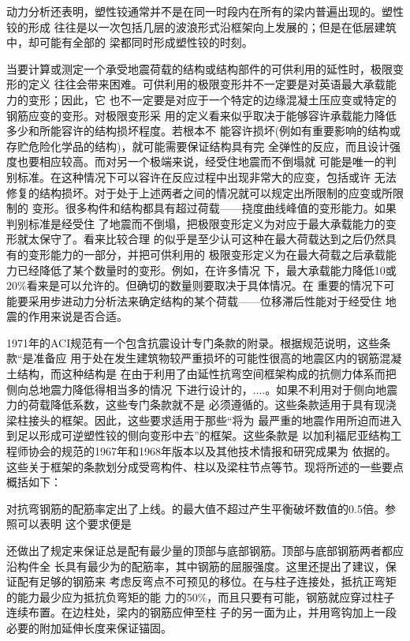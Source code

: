 \documentclass[12pt,a4paper]{book}
\begin{document}
动力分析还表明，塑性铰通常并不是在同一时段内在所有的梁内普遍出现的。塑性铰的形成
往往是以一次包括几层的波浪形式沿框架向上发展的；但是在低层建筑中，却可能有全部的
梁都同时形成塑性铰的时刻。

当要计算或测定一个承受地震荷载的结构或结构部件的可供利用的延性时，极限变形的定义
往往会带来困难。可供利用的极限变形并不一定要是对英语最大承载能力的变形；因此，它
也不一定要是对应于一个特定的边缘混凝土压应变或特定的钢筋应变的变形。对极限变形采
用的定义看来似乎取决于能够容许承载能力降低多少和所能容许的结构损坏程度。若根本不
能容许损坏(例如有重要影响的结构或存贮危险化学品的结构)，就可能需要保证结构具有完
全弹性的反应，而且设计强度也要相应较高。而对另一个极端来说，经受住地震而不倒塌就
可能是唯一的判别标准。在这种情况下可以容许在反应过程中出现非常大的应变，包括或许
无法修复的结构损坏。对于处于上述两者之间的情况就可以规定出所限制的应变或所限制的
变形。很多构件和结构都具有超过荷载——挠度曲线峰值的变形能力。如果判别标准是经受住
了地震而不倒塌，把极限变形定义为对应于最大承载能力的变形就太保守了。看来比较合理
的似乎是至少认可这种在最大荷载达到之后仍然具有的变形能力的一部分，并把可供利用的
极限变形定义为在最大荷载之后承载能力已经降低了某个数量时的变形。例如，在许多情况
下，最大承载能力降低10或20\%看来是可以允许的。但确切的数量则要取决于具体情况。在
重要的情况下可能要采用步进动力分析法来确定结构的某个荷载——位移滞后性能对于经受住
地震的作用来说是否合适。

1971年的ACI规范有一个包含抗震设计专门条款的附录。根据规范说明，这些条款“是准备应
用于处在发生建筑物较严重损坏的可能性很高的地震区内的钢筋混凝土结构，而这种结构是
在由于利用了由延性抗弯空间框架构成的抗侧力体系而把侧向总地震力降低得相当多的情况
下进行设计的，....。如果不利用对于侧向地震力的荷载降低系数，这些专门条款就不是
必须遵循的。这些条款适用于具有现浇梁柱接头的框架。因此，这些要求适用于那些“将为
最严重的地震作用所迫而进入到足以形成可逆塑性铰的侧向变形中去”的框架。这些条款是
以加利福尼亚结构工程师协会的规范的1967年和1968年版本以及其他技术情报和研究成果为
依据的。这些关于框架的条款划分成受弯构件、柱以及梁柱节点等节。现将所述的一些要点
概括如下：

对抗弯钢筋的配筋率定出了上线。的最大值不超过产生平衡破坏数值的0.5倍。参照可以表明
这个要求便是

还做出了规定来保证总是配有最少量的顶部与底部钢筋。顶部与底部钢筋两者都应沿构件全
长具有最少为的配筋率，其中钢筋的屈服强度。这里还提出了建议，保证配有足够的钢筋来
考虑反弯点不可预见的移位。在与柱子连接处，抵抗正弯矩的能力最少应为抵抗负弯矩的能
力的50\%，而且只要有可能，钢筋就应穿过柱子连续布置。在边柱处，梁内的钢筋应伸至柱
子的另一面为止，并用弯钩加上一段必要的附加延伸长度来保证锚固。
\end{document}
